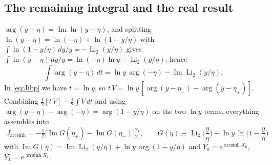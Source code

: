\documentclass[11pt]{article}
\numberwithin{equation}{section}
\newcommand{\half}{\tfrac{1}{2}}
\DeclareMathOperator{\arcsinh}{arcsinh}
\DeclareMathOperator{\Li}{Li}
\begin{document}
\subsection{The remaining integral and the real result}
$\arg(y-\eta)=\operatorname{Im}\ln(y-\eta)$, and splitting
$\ln(y-\eta)=\ln(-\eta)+\ln(1-y/\eta)$ with $\int\ln(1-y/\eta)\,dy/y=-\Li_2(y/\eta)$ gives
$\int\ln(y-\eta)\,dy/y=\ln(-\eta)\ln y-\Li_2(y/\eta)$, hence
\begin{equation}\label{eq:intarg}
  \int\arg(y-\eta)\,dt=\ln y\,\arg(-\eta)-\operatorname{Im}\Li_2(y/\eta).
\end{equation}
In \eqref{eq:Jibp} we have $t=\ln y$, so $t\,V=\ln y\,[\arg(y-\eta_-)-\arg(y-\eta_+)]$. Combining
$\half[t\,V]-\half\int V\,dt$ and using $\arg(y-\eta)-\arg(-\eta)=\arg(1-y/\eta)$ on the two $\ln y$
terms, everything assembles into
\begin{equation}\label{eq:Jreal}
  \boxed{\;J_{\arcsinh}=-\half\Big[\operatorname{Im}G(\eta_+)-\operatorname{Im}G(\eta_-)\Big]_{Y_0}^{Y_1},
  \qquad G(\eta)\equiv\Li_2\!\Big(\frac{y}{\eta}\Big)+\ln y\,\ln\!\Big(1-\frac{y}{\eta}\Big)\;}
\end{equation}
with $\operatorname{Im}G(\eta)=\operatorname{Im}\Li_2(y/\eta)+\ln y\,\arg(1-y/\eta)$ and
$Y_0=e^{\arcsinh X_0}$, $Y_1=e^{\arcsinh X_1}$.
\end{document}
